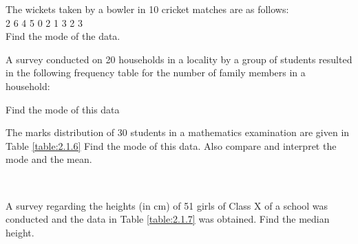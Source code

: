 \item The wickets taken by a bowler in 10 cricket matches are as follows:\\
2 6 4 5 0 2 1 3 2 3\\
Find the mode of the data.
\\
\solution

\item A survey conducted on 20 households in a locality by a group of students
resulted in the following frequency table for the number of family members in a
household:
\begin{table}[!ht]
\centering
{}
\caption{}
\label{table:2.1.5}
\end{table}
Find the mode of this data
\\
\solution

\item The marks distribution of 30 students in a mathematics examination are
given in Table \ref{table:2.1.6}
Find the mode of this data. Also compare and
interpret the mode and the mean.
\begin{table}[!ht]
	\centering
	
\caption{}
\label{table:2.1.6}
\end{table}
\\
\solution


\item A survey regarding the heights (in cm) of 51 girls of Class X of a school
was conducted and the  data in Table \ref{table:2.1.7}
was obtained.  Find the median height.

